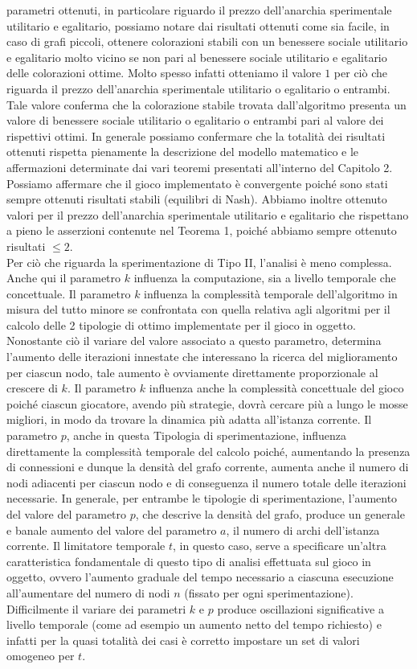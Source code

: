 parametri ottenuti, in particolare riguardo il prezzo dell'anarchia sperimentale utilitario e egalitario, possiamo notare dai risultati ottenuti come sia facile, in caso di grafi piccoli, ottenere colorazioni stabili con un benessere sociale utilitario e egalitario molto vicino se non pari al benessere sociale utilitario e egalitario delle colorazioni ottime. Molto spesso infatti otteniamo il valore $1$ per ciò che riguarda il prezzo dell'anarchia sperimentale utilitario o egalitario o entrambi. Tale valore conferma che la colorazione stabile trovata dall'algoritmo presenta un valore di benessere sociale utilitario o egalitario o entrambi pari al valore dei rispettivi ottimi. In generale possiamo confermare che la totalità dei risultati ottenuti rispetta pienamente la descrizione del modello matematico e le affermazioni determinate dai vari teoremi presentati all'interno del Capitolo 2. Possiamo affermare che il gioco implementato è convergente poiché sono stati sempre ottenuti risultati stabili (equilibri di Nash). Abbiamo inoltre ottenuto valori per il prezzo dell'anarchia sperimentale utilitario e egalitario che rispettano a pieno le asserzioni contenute nel Teorema 1, poiché abbiamo sempre ottenuto risultati \(\leq 2\).\\
Per ciò che riguarda la sperimentazione di Tipo II, l'analisi è meno complessa. Anche qui il parametro $k$ influenza la computazione, sia a livello temporale che concettuale. Il parametro $k$ influenza la complessità temporale dell'algoritmo in misura del tutto minore se confrontata con quella relativa agli algoritmi per il calcolo delle 2 tipologie di ottimo implementate per il gioco in oggetto. Nonostante ciò il variare del valore associato a questo parametro, determina l'aumento delle iterazioni innestate che interessano la ricerca del miglioramento per ciascun nodo, tale aumento è ovviamente direttamente proporzionale al crescere di $k$. Il parametro $k$ influenza anche la complessità concettuale del gioco poiché ciascun giocatore, avendo più strategie, dovrà cercare più a lungo le mosse migliori, in modo da trovare la dinamica più adatta all'istanza corrente. Il parametro $p$, anche in questa Tipologia di sperimentazione, influenza direttamente la complessità temporale del calcolo poiché, aumentando la presenza di connessioni e dunque la densità del grafo corrente, aumenta anche il numero di nodi adiacenti per ciascun nodo e di conseguenza il numero totale delle iterazioni necessarie. In generale, per entrambe le tipologie di sperimentazione, l'aumento del valore del parametro $p$, che descrive la densità del grafo, produce un generale e banale aumento del valore del parametro $a$, il numero di archi dell'istanza corrente. Il limitatore temporale $t$, in questo caso, serve a specificare un'altra caratteristica fondamentale di questo tipo di analisi effettuata sul gioco in oggetto, ovvero l'aumento graduale del tempo necessario a ciascuna esecuzione all'aumentare del numero di nodi $n$ (fissato per ogni sperimentazione). Difficilmente il variare dei parametri $k$ e $p$ produce oscillazioni significative a livello temporale (come ad esempio un aumento netto del tempo richiesto) e infatti per la quasi totalità dei casi è corretto impostare un set di valori omogeneo per $t$.\\
